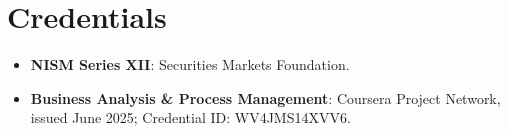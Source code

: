 \documentclass[letterpaper,9.5pt]{article}
\newcommand{\resumeItem}[2]{
  \item\small{
    \textbf{#1}{: #2 \vspace{-2pt}}
  }
}
\newcommand{\resumeSubItem}[2]{\resumeItem{#1}{#2}\vspace{-4pt}}
\newcommand{\resumeSubHeadingListStart}{\begin{itemize}[leftmargin=*]}
\newcommand{\resumeSubHeadingListEnd}{\end{itemize}}
\begin{document}
\section{Credentials}
\vspace{-2pt}
\resumeSubHeadingListStart
  \resumeSubItem{NISM Series XII}
    {Securities Markets Foundation.}
  \resumeSubItem{Business Analysis \& Process Management}
    {Coursera Project Network, issued June 2025; Credential ID: WV4JMS14XVV6.}
\resumeSubHeadingListEnd
\end{document}

